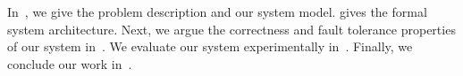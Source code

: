 In~,
we give the problem description and our system model.
 gives the formal system architecture.
Next, we argue the correctness and fault tolerance properties of our system in~.
We evaluate our system experimentally in~.
Finally, we conclude our work in~.
